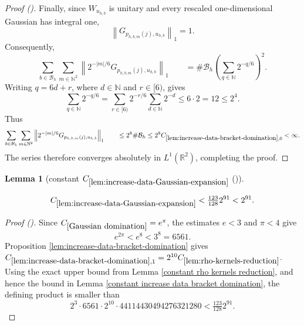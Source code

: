 \documentclass[12pt,reqno]{amsart}
\newcommand{\auto}{{({\tiny\faCar})}}
\theoremstyle{plain}
\newtheorem{lemma}[theorem]{Lemma}
\numberwithin{equation}{section}
\theoremstyle{remark}
\newcommand{\uses}[1]{}
\newcommand{\usesdefs}[1]{}
\newcommand{\leanok}{}
\newcommand{\lean}[1]{}
\begin{document}
\begin{proof}[Proof \auto]
Finally, since \(W_{u_{h,b}}\) is unitary and every rescaled
one-dimensional Gaussian has integral one,
\[
\left\|
G_{p_{h,b,m}(j),u_{h,b}}
\right\|_1
=
1.
\]
Consequently,
\[
\sum_{b\in\mathcal B_h} \sum_{m\in\mathbb N^2} \left\| 2^{-|m|/6} G_{p_{h,b,m}(j),u_{h,b}} \right\|_1 \qquad= \#\mathcal B_h \left( \sum_{q\in\mathbb N}2^{-q/6} \right)^2.
\]
Writing \(q=6d+r\), where \(d\in\mathbb N\) and \(r\in[6)\), gives
\[
\sum_{q\in\mathbb N}2^{-q/6} = \sum_{r\in[6)} 2^{-r/6} \sum_{d\in\mathbb N}2^{-d} \leq 6\cdot2 = 12 \leq2^4.
\]
Thus
\[
\sum_{b\in\mathcal B_h} \sum_{m\in\mathbb N^2} \left\| 2^{-|m|/6} G_{p_{h,b,m}(j),u_{h,b}} \right\|_1 \qquad\leq 2^8\#\mathcal B_h \leq 2^8 C_{\ref{lem:increase-data-bracket-domination},0} < \infty.
\]
The series therefore converges absolutely in
\(L^1(\mathbb R^2)\), completing the proof.
\end{proof}

\begin{lemma}[constant $C_{\ref{lem:increase-data-Gaussian-expansion}}$ \auto]\label{constant increase data Gaussian expansion}\uses{lem:increase-data-bracket-domination,constant increase data bracket domination,constant rho kernels reduction,lem:rho-kernels-reduction,Gaussian domination,lem:increase-data-Gaussian-expansion}\usesdefs{}
\lean{Auto.constantIncreaseDataGaussianExpansion}
\leanok
\begin{equation}\label{constant increase data Gaussian expansion bound}
C_{\ref{lem:increase-data-Gaussian-expansion}}
<\tfrac{123}{128}2^{91}<2^{91}.
\end{equation}
\end{lemma}
\begin{proof}[Proof \auto]
Since $C_{\ref{Gaussian domination}}=e^\pi$, the estimates $e<3$ and $\pi<4$ give
\[
e^{2\pi}<e^8<3^8=6561.
\]
Proposition \ref{lem:increase-data-bracket-domination} gives
$C_{\ref{lem:increase-data-bracket-domination},1}=2^{10}C_{\ref{lem:rho-kernels-reduction}}$.
Using the exact upper bound from Lemma \ref{constant rho kernels reduction}, and hence the bound in Lemma \ref{constant increase data bracket domination}, the defining product is smaller than
\[
2^3\cdot6561\cdot2^{10}\cdot44114430494276321280
<\tfrac{123}{128}2^{91}.
\]
\end{proof}
\end{document}
